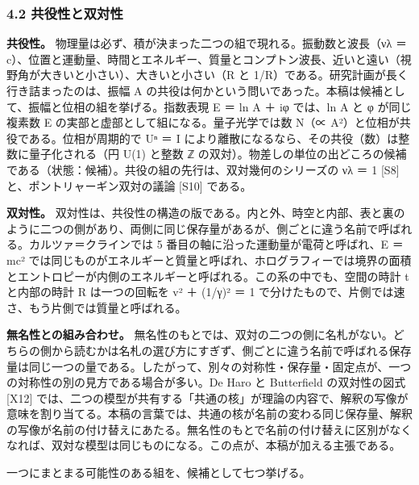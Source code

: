 \documentclass[
  a4paper,
]{ltjsarticle}
\begin{document}
\subsubsection{4.2
共役性と双対性}\label{ux5171ux5f79ux6027ux3068ux53ccux5bfeux6027}

\textbf{共役性。}
物理量は必ず、積が決まった二つの組で現れる。振動数と波長（νλ ＝
c）、位置と運動量、時間とエネルギー、質量とコンプトン波長、近いと遠い（視野角が大きいと小さい）、大きいと小さい（R
と 1/R）である。研究計画が長く行き詰まったのは、振幅 A
の共役は何かという問いであった。本稿は候補として、振幅と位相の組を挙げる。指数表現
E ＝ ln A ＋ iφ では、ln A と φ が同じ複素数 E
の実部と虚部として組になる。量子光学では数 N（∝
A²）と位相が共役である。位相が周期的で Uⁿ ＝ I
により離散になるなら、その共役（数）は整数に量子化される（円 U(1) と整数
ℤ
の双対）。物差しの単位の出どころの候補である（状態：候補）。共役の組の先行は、双対幾何のシリーズの
νλ ＝ 1 {[}S8{]} と、ポントリャーギン双対の議論 {[}S10{]} である。

\textbf{双対性。}
双対性は、共役性の構造の版である。内と外、時空と内部、表と裏のように二つの側があり、両側に同じ保存量があるが、側ごとに違う名前で呼ばれる。カルツァ＝クラインでは
5 番目の軸に沿った運動量が電荷と呼ばれ、E ＝ mc²
では同じものがエネルギーと質量と呼ばれ、ホログラフィーでは境界の面積とエントロピーが内側のエネルギーと呼ばれる。この系の中でも、空間の時計
t と内部の時計 R は一つの回転を v² ＋ (1/γ)² ＝ 1
で分けたもので、片側では速さ、もう片側では質量と呼ばれる。

\textbf{無名性との組み合わせ。}
無名性のもとでは、双対の二つの側に名札がない。どちらの側から読むかは名札の選び方にすぎず、側ごとに違う名前で呼ばれる保存量は同じ一つの量である。したがって、別々の対称性・保存量・固定点が、一つの対称性の別の見方である場合が多い。De
Haro と Butterfield の双対性の図式 {[}X12{]}
では、二つの模型が共有する「共通の核」が理論の内容で、解釈の写像が意味を割り当てる。本稿の言葉では、共通の核が名前の変わる同じ保存量、解釈の写像が名前の付け替えにあたる。無名性のもとで名前の付け替えに区別がなくなれば、双対な模型は同じものになる。この点が、本稿が加える主張である。

一つにまとまる可能性のある組を、候補として七つ挙げる。
\end{document}
